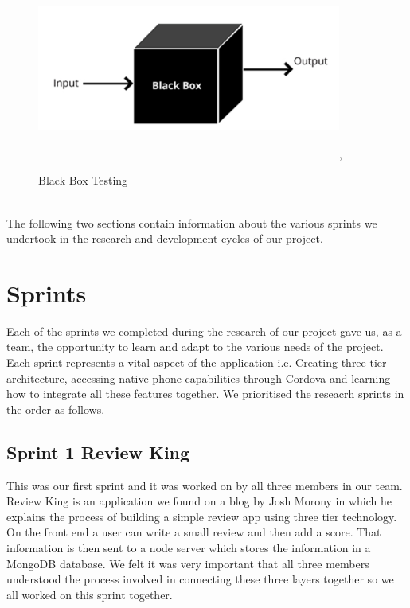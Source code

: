 \begin{figure}[h]
\centering
\includegraphics[width=10cm, height=6cm]{img/black_box.PNG},
\caption{Black Box Testing}
\label{black_box}
\end{figure} \\


\noindent The following two sections contain information about the various sprints we undertook in the research and development cycles of our project.

\section{Sprints} \label{reseacrh_sprints}
Each of the sprints we completed during the research of our project gave us, as a team, the opportunity to learn and adapt to the various needs of the project. Each sprint represents a vital aspect of the application i.e. Creating three tier architecture, accessing native phone capabilities through Cordova and learning how to integrate all these features together. We prioritised the reseacrh sprints in the order as follows.

\subsection{Sprint 1 Review King}
This was our first sprint and it was worked on by all three members in our team. Review King is an application we found on a blog by Josh Morony \cite{ReviewKing} in which he explains the process of building a simple review app using three tier technology. On the front end a user can write a small review and then add a score. That information is then sent to a node server which stores the information in a MongoDB database. We felt it was very important that all three members understood the process involved in connecting these three layers together so we all worked on this sprint together.   


